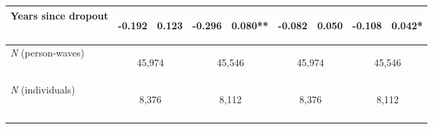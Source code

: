 \begin{center}
\begin{tabular}{lcccccccc}
\hspace{1em} Years since dropout & \begin{bf}-0.192\end{bf} & \begin{bf}0.123\end{bf} & \begin{rm}-0.296\end{rm} & \begin{rm}0.080**\end{rm} & \begin{bf}-0.082\end{bf} & \begin{bf}0.050\end{bf} & \begin{rm}-0.108\end{rm} & \begin{rm}0.042*\end{rm}\\
\hline \textit{N} (person-waves) & \multicolumn{2}{c}{\begin{bf}45,974\end{bf}} & \multicolumn{2}{c}{\begin{rm}45,546\end{rm}} & \multicolumn{2}{c}{\begin{bf}45,974\end{bf}} & \multicolumn{2}{c}{\begin{rm}45,546\end{rm}}\\
\textit{N} (individuals) & \multicolumn{2}{c}{\begin{bf}8,376\end{bf}} & \multicolumn{2}{c}{\begin{rm}8,112\end{rm}} & \multicolumn{2}{c}{\begin{bf}8,376\end{bf}} & \multicolumn{2}{c}{\begin{rm}8,112\end{rm}}\\
\noalign{\smallskip}\hline\end{tabular}\\
\end{center}
